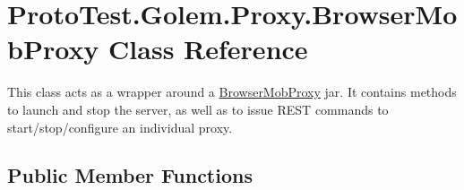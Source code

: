\hypertarget{class_proto_test_1_1_golem_1_1_proxy_1_1_browser_mob_proxy}{\section{Proto\-Test.\-Golem.\-Proxy.\-Browser\-Mob\-Proxy Class Reference}
\label{class_proto_test_1_1_golem_1_1_proxy_1_1_browser_mob_proxy}
}


This class acts as a wrapper around a \hyperlink{class_proto_test_1_1_golem_1_1_proxy_1_1_browser_mob_proxy}{Browser\-Mob\-Proxy} jar. It contains methods to launch and stop the server, as well as to issue R\-E\-S\-T commands to start/stop/configure an individual proxy.  


\subsection*{Public Member Functions}
